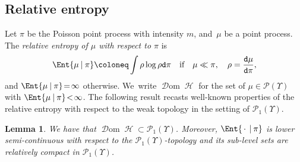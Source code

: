 \documentclass[JEP,XML,SOM,Unicode,published]{cedram}
\newtheorem{lemma}[theorem]{Lemma}
\theoremstyle{definition}
\theoremstyle{remark}
\newcommand{\given}[1][]{%
\nonscript\:#1\vert
\allowbreak
\nonscript\:
\mathopen{}}
\DeclareMathOperator{\ent}{\mathcal{H}}
\DeclareMathOperator{\dom}{\mathscr{D}om}
\newcommand{\emparg}{\,\cdot\,}
\begin{document}
\subsection{Relative entropy}
Let $\pi$ be the Poisson point process with intensity $m$, and~$\mu$ be a point process.
The \emph{relative entropy of $\mu$ with respect to $\pi$} is
\begin{equation*}
\Ent{\mu \given \pi} \coloneq \int \rho \log \rho \mathtt{d} \pi \quad \text{if} \quad \mu\ll \pi , \quad \rho= \frac{\mathtt{d} \mu}{\mathtt{d} \pi},
\end{equation*}
and $\Ent{\mu \given \pi} \!=\! \infty$ otherwise. We~write $\dom \ent$ for the set of $\mu \!\in\! \mathscr{P}(\varUpsilon)$ with $\Ent{\mu \given \pi} \!<\! \infty$.
The following result recasts well-known properties of the relative entropy with respect to the weak topology in the setting of $\mathscr{P}_{1}(\varUpsilon)$.
\begin{lemma}\label{t:lsc-H}
We have that $\dom \ent \subset \mathscr{P}_{1}(\varUpsilon)$.
Moreover, $\Ent{\emparg \given \pi}$ is lower semi-continuous with respect to the $\mathscr{P}_{1}(\varUpsilon)$-topology and its sub-level sets are relatively compact in $\mathscr{P}_{1}(\varUpsilon)$.
\end{lemma}
\end{document}
